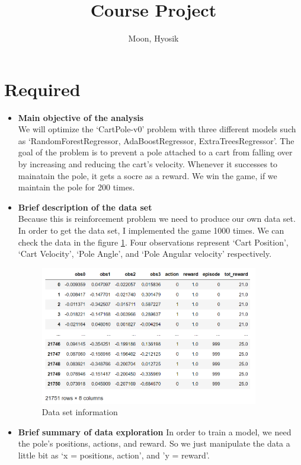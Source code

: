 \documentclass[12pt]{article}
\title{Course Project}
\author{
  Moon, Hyosik
  }
\begin{document}
\maketitle

\section{Required}

\begin{itemize}
\item \textbf{Main objective of the analysis} \\
We will optimize the `CartPole-v0' problem with three different models such as `RandomForestRegressor, AdaBoostRegressor, ExtraTreesRegressor'. The goal of the problem is to prevent a pole attached to a cart from falling over by increasing and reducing the cart's velocity. Whenever it successes to mainatain the pole, it gets a socre as a reward. We win the game, if we maintain the pole for 200 times.

\item \textbf{Brief description of the data set} \\
Because this is reinforcement problem we need to produce our own data set. In order to get the data set, I implemented the game 1000 times. We can check the data in the figure \ref{data}. Four observations represent `Cart Position', `Cart Velocity', `Pole Angle', and `Pole Angular velocity' respectively. 

\begin{figure}[H]
    \centering
    \includegraphics[width=0.9\textwidth]{figures/data.png}
    \caption{Data set information}\label{data}
\end{figure}

\item \textbf{Brief summary of data exploration}
In order to train a model, we need the pole's positions, actions, and reward. So we just manipulate the data a little bit as `x = positions, action', and 'y = reward'.
    

\end{itemize}
\end{document}
